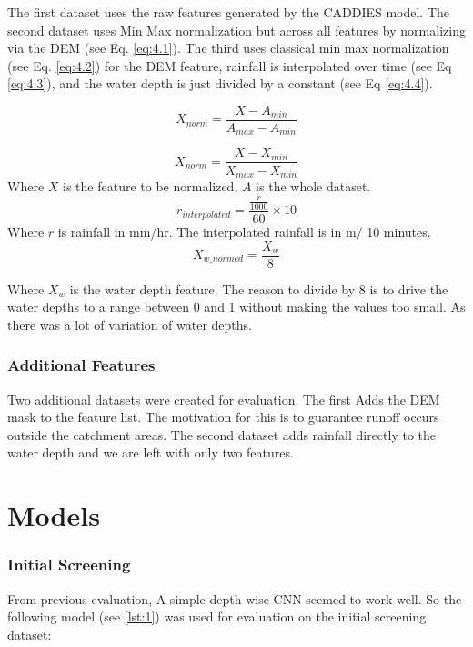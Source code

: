 The first dataset uses the raw features generated by the CADDIES model. The second dataset uses Min Max normalization but across all features by normalizing via the DEM (see Eq. \ref{eq:4.1}). The third uses classical min max normalization (see Eq. \ref{eq:4.2}) for the DEM feature, rainfall is interpolated over time (see Eq \ref{eq:4.3}), and the water depth is just divided by a constant  (see Eq \ref{eq:4.4}).

\begin{equation}
	\label{eq:4.1}
	X_{norm} = \frac{X-A_{min}}{A_{max}-A_{min}}
\end{equation}

\begin{equation}
	\label{eq:4.2}
	X_{norm} = \frac{X-X_{min}}{X_{max}-X_{min}}
\end{equation}
Where $X$ is the feature to be normalized, $A$ is the whole dataset.
\begin{equation}
	\label{eq:4.3}
	r_{interpolated} = \frac{\frac{r}{1000}}{60} \times 10
\end{equation}
Where $r$ is rainfall in mm/hr. The interpolated rainfall is in m/ 10 minutes.
\begin{equation}
	\label{eq:4.4}
	X_{w \_ normed} = \frac{X_{w}}{8}  
\end{equation}

Where $X_{w}$ is the water depth feature. The reason to divide by 8 is to drive the water depths to a range between 0 and 1 without making the values too small. As there was a lot of variation of water depths.

\subsubsection*{Additional Features}
Two additional datasets were created for evaluation. The first Adds the DEM mask to the feature list. The motivation for this is to guarantee  runoff occurs outside the catchment areas. The second dataset adds rainfall directly to the water depth and we are left with only two features.

\section{Models}

\subsubsection*{Initial Screening}
From previous evaluation, A simple depth-wise CNN seemed to work well.  So the following model (see \ref{lst:1}) was used for evaluation on the initial screening dataset:

